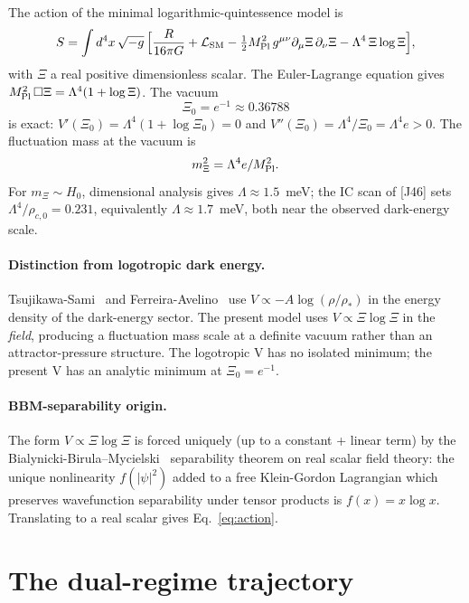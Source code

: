 \documentclass[aps,prl,reprint,floatfix,nofootinbib]{revtex4-2}
\newcommand{\Mpl}{M_{\rm Pl}}
\newcommand{\rhoc}{\rho_{c,0}}
\begin{document}
The action of the minimal logarithmic-quintessence model is
\begin{equation}
S = \int d^4x\,\sqrt{-g}\,\Big[
  \frac{R}{16\pi G} + \mathcal{L}_{\rm SM}
  - \tfrac{1}{2}\Mpl^2\,g^{\mu\nu}\partial_\mu\Xi\,\partial_\nu\Xi
  - \Lambda^4\,\Xi\log\Xi\Big],
\label{eq:action}
\end{equation}
with $\Xi$ a real positive dimensionless scalar. The
Euler-Lagrange equation gives $\Mpl^2\,\Box\Xi = \Lambda^4(1 +
\log\Xi)$. The vacuum
\begin{equation}
\Xi_0 = e^{-1} \approx 0.36788
\label{eq:vacuum}
\end{equation}
is exact: $V'(\Xi_0) = \Lambda^4(1+\log\Xi_0) = 0$ and
$V''(\Xi_0) = \Lambda^4/\Xi_0 = \Lambda^4 e > 0$. The
fluctuation mass at the vacuum is
\begin{equation}
m_\Xi^2 = \Lambda^4 e / \Mpl^2.
\label{eq:mass}
\end{equation}
For $m_\Xi \sim H_0$, dimensional analysis gives $\Lambda
\approx 1.5$~meV; the IC scan of [J46] sets $\Lambda^4 / \rhoc
= 0.231$, equivalently $\Lambda \approx 1.7$~meV, both near
the observed dark-energy scale.

\paragraph*{Distinction from logotropic dark energy.}
Tsujikawa-Sami~\cite{TsujikawaSami2007} and
Ferreira-Avelino~\cite{FerreiraAvelino2018} use $V \propto -A
\log(\rho/\rho_*)$ in the energy density of the dark-energy
sector. The present model uses $V \propto \Xi\log\Xi$ in the
\emph{field}, producing a fluctuation mass scale at a definite
vacuum rather than an attractor-pressure structure. The
logotropic V has no isolated minimum; the present V has an
analytic minimum at $\Xi_0 = e^{-1}$.

\paragraph*{BBM-separability origin.}
The form $V \propto \Xi\log\Xi$ is forced uniquely (up to a
constant + linear term) by the
Bialynicki-Birula--Mycielski~\cite{BBM1976} separability
theorem on real scalar field theory: the unique nonlinearity
$f(|\psi|^2)$ added to a free Klein-Gordon Lagrangian which
preserves wavefunction separability under tensor products is
$f(x) = x\log x$. Translating to a real scalar gives
Eq.~\eqref{eq:action}.

\section{The dual-regime trajectory}\label{sec:trajectory}
\end{document}
